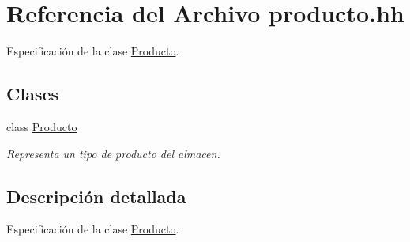 \hypertarget{producto_8hh}{}\section{Referencia del Archivo producto.\+hh}
\label{producto_8hh}


Especificación de la clase \mbox{\hyperlink{class_producto}{Producto}}.  


\subsection*{Clases}
\begin{DoxyCompactItemize}
\item 
class \mbox{\hyperlink{class_producto}{Producto}}
\begin{DoxyCompactList}\small\item\em Representa un tipo de producto del almacen. \end{DoxyCompactList}\end{DoxyCompactItemize}


\subsection{Descripción detallada}
Especificación de la clase \mbox{\hyperlink{class_producto}{Producto}}. 

